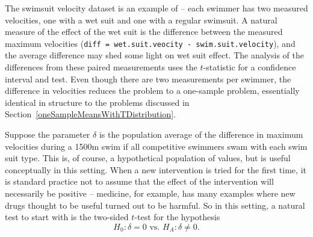 

	
The swimsuit velocity dataset is an example of  -- each swimmer has two measured velocities, one with a wet suit and one with a regular swimsuit.  A natural measure of the effect of the wet suit is the difference between the measured maximum velocities (\texttt{diff = wet.suit.veocity - swim.suit.velocity}), and the average difference may shed some light on wet suit effect.  The analysis of the differences from these paired measurements uses the $t$-statistic for a confidence interval and test.  Even though there are two measurements per swimmer, the difference in velocities reduces the problem to a one-sample problem, essentially identical in structure to the problems discussed in Section~\ref{oneSampleMeansWithTDistribution}.

Suppose the parameter $\delta$ is the population average of the difference in maximum velocities during a 1500m swim if all competitive swimmers swam with each swim suit type. This is, of course, a hypothetical population of values, but is useful conceptually in this setting.  When a new intervention is tried for the first time, it is standard practice not to assume that the effect of the intervention will necessarily be positive  -- medicine, for example, has many examples where new drugs thought to be useful turned out to be harmful.  So in this setting, a natural test to start with is the two-sided $t$-test for the hypothesis
\[
    H_0: \delta = 0 \text{  vs.  } H_A: \delta \neq 0.
\]

